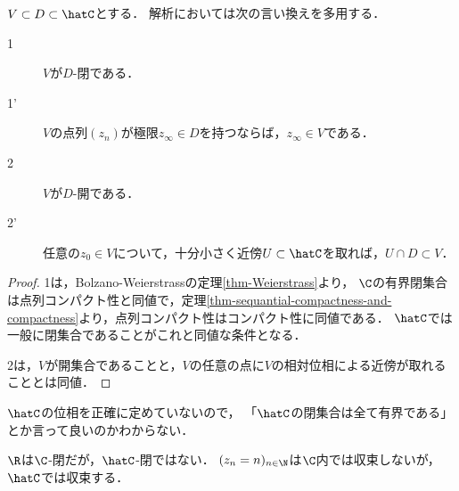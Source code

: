 \documentclass[uplatex, dvipdfmx]{jsreport}
\begin{document}
\begin{proposition}[Riemann球面の部分集合の相対位相による開閉の特徴付け]\label{proposition-region-is-connected}
    $V\subset D\subset\hatC$とする．
    解析においては次の言い換えを多用する．
    \begin{description}
        \item[1] $V$が$D$-閉である．
        \item[1'] $V$の点列$(z_n)$が極限$z_\infty\in D$を持つならば，$z_\infty\in V$である．
        \item[2] $V$が$D$-開である．
        \item[2'] 任意の$z_0\in V$について，十分小さく近傍$U\subset\hatC$を取れば，$U\cap D\subset V$．
    \end{description}
\end{proposition}
\begin{proof}
    1は，Bolzano-Weierstrassの定理\ref{thm-Weierstrass}より，
    $\C$の有界閉集合は点列コンパクト性と同値で，定理\ref{thm-sequantial-compactness-and-compactness}より，点列コンパクト性はコンパクト性に同値である．
    $\hatC$では一般に閉集合であることがこれと同値な条件となる．

    2は，$V$が開集合であることと，$V$の任意の点に$V$の相対位相による近傍が取れることとは同値．
\end{proof}
\begin{remarks}
    $\hatC$の位相を正確に定めていないので，
    「$\hatC$の閉集合は全て有界である」とか言って良いのかわからない．
\end{remarks}

\begin{example}
    $\R$は$\C$-閉だが，$\hatC$-閉ではない．
    $(z_n=n)_{n\in\N}$は$\C$内では収束しないが，$\hatC$では収束する．
\end{example}
\end{document}
